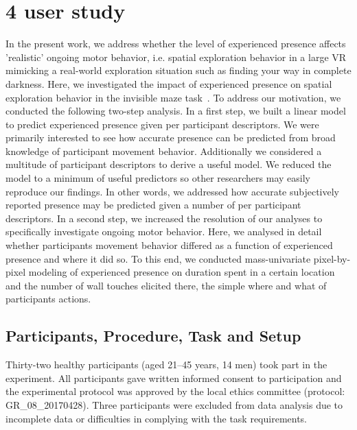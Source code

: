 \section{4 user study}
In the present work, we address whether the level of experienced presence affects 'realistic' ongoing motor behavior, i.e. spatial exploration behavior in a large VR mimicking a real-world exploration situation such as finding your way in complete darkness. Here, we investigated the impact of experienced presence on spatial exploration behavior in the invisible maze task~\cite{Gehrke2018}. To address our motivation, we conducted the following two-step analysis. In a first step, we built a linear model to predict experienced presence given per participant descriptors. We were primarily interested to see how accurate presence can be predicted from broad knowledge of participant movement behavior. Additionally we considered a multitude of participant descriptors to derive a useful model. We reduced the model to a minimum of useful predictors so other researchers may easily reproduce our findings. In other words, we addressed how accurate subjectively reported presence may be predicted given a number of per participant descriptors.
In a second step, we increased the resolution of our analyses to specifically investigate ongoing motor behavior. Here, we analysed in detail whether participants movement behavior differed as a function of experienced presence and where it did so. To this end, we conducted mass-univariate pixel-by-pixel modeling of experienced presence on duration spent in a certain location and the number of wall touches elicited there, the simple where and what of participants actions.

\subsection{Participants, Procedure, Task and Setup} Thirty-two healthy participants (aged 21--45 years, 14 men) took part in the experiment. All participants gave written informed consent to participation and the experimental protocol was approved by the local ethics committee (protocol: GR\_08\_20170428). Three participants were excluded from data analysis due to incomplete data or difficulties in complying with the task requirements.


